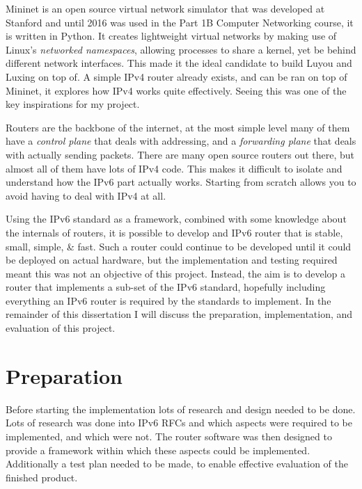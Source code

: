 \documentclass[12pt,a4paper,twoside,openright]{report}
\begin{document}
\bigskip

Mininet\cite{mininet} is an open source virtual network simulator that was developed at Stanford and until 2016 was used in the Part 1B Computer Networking course, it is written in Python.  It creates lightweight virtual networks by making use of Linux's \textit{networked namespaces}, allowing processes to share a kernel, yet be behind different network interfaces. This made it the ideal candidate to build Luyou and Luxing on top of. A simple IPv4 router\cite{simple_router} already exists, and can be ran on top of Mininet, it explores how IPv4 works quite effectively.  Seeing this was one of the key inspirations for my project.

\bigskip

Routers are the backbone of the internet, at the most simple level many of them have a \textit{control plane} that deals with addressing, and a \textit{forwarding plane} that deals with actually sending packets. There are many open source routers out there, but almost all of them have lots of IPv4 code. This makes it difficult to isolate and understand how the IPv6 part actually works.  Starting from scratch allows you to avoid having to deal with IPv4 at all.  

\bigskip

Using the IPv6 standard as a framework, combined with some knowledge about the internals of routers, it is possible to develop and IPv6 router that is stable, small, simple, \& fast.  Such a router could continue to be developed until it could be deployed on actual hardware, but the implementation and testing required meant this was not an objective of this project.  Instead, the aim is to develop a router that implements a sub-set of the IPv6 standard, hopefully including everything an IPv6 router is required by the standards to implement.  In the remainder of this dissertation I will discuss the preparation, implementation, and evaluation of this project.

\chapter{Preparation}
\label{chap::preperation}

Before starting the implementation lots of research and design needed to be done. Lots of research was done into IPv6 RFCs and which aspects were required to be implemented, and which were not. The router software was then designed to provide a framework within which these aspects could be implemented.  Additionally a test plan needed to be made, to enable effective evaluation of the finished product.
\end{document}
